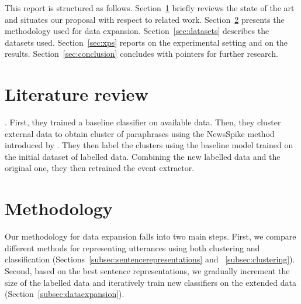 \documentclass[11pt]{article}
\begin{document}
This report is structured as follows. Section~\ref{sec:relatedwork}
briefly reviews the state of the art and situates our proposal with
respect to related work.  Section~\ref{sec:methodology} presents the
methodology used for data expansion. Section~\ref{sec:datasets} describes
the datasets used. Section~\ref{sec:xps} reports on the experimental
setting and on the results. Section~\ref{sec:conclusion} concludes
with pointers for further research.

\section{Literature review}
\label{sec:relatedwork}

\cite{N18-2058} . First, they trained a baseline classifier on available data. Then, they cluster external data to obtain cluster of paraphrases using the NewsSpike method introduced by \cite{zhang2015}. They then label the clusters using the baseline model trained on the initial dataset of labelled data. Combining the new labelled data and the original one, they then retrained the event extractor.

\section{Methodology}
\label{sec:methodology}

Our methodology for data expansion falls into two main steps. First, we compare different methods for representing utterances using both clustering and classification (Sections~\ref{subsec:sentencerepresentations} and ~\ref{subsec:clustering}). Second, based on the best sentence representations, we gradually increment the size of the labelled data and iteratively train new classifiers on the extended data (Section~\ref{subsec:dataexpansion}). 



\end{document}
